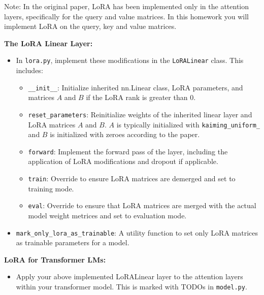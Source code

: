 \documentclass[11pt,addpoints,answers]{exam}
\begin{document}
\begin{questions}
Note: In the original paper, LoRA has been implemented only in the attention layers, specifically for the query and value matrices. In this homework you will implement LoRA on the query, key and value matrices.

\textbf{The LoRA Linear Layer:}

\begin{itemize}
    \item In \lstinline{lora.py}, implement these modifications in the \lstinline{LoRALinear} class. This includes:
    \begin{itemize}
        \item \lstinline{__init__}: Initialize inherited nn.Linear class, LoRA parameters, and matrices \(A\) and \(B\) if the LoRA rank is greater than 0.
        \item \lstinline{reset_parameters}: Reinitialize weights of the inherited linear layer and LoRA matrices \(A\) and \(B\). \(A\) is typically initialized with \lstinline{kaiming_uniform_} and \(B\) is initialized with zeroes according to the paper.
        \item \lstinline{forward}: Implement the forward pass of the layer, including the application of LoRA modifications and dropout if applicable.
        \item \lstinline{train}: Override to ensure LoRA matrices are demerged and set to training mode.
        \item \lstinline{eval}: Override to ensure that LoRA matrices are merged with the actual model weight metrices and set to evaluation mode.

    \end{itemize}
        \item \lstinline{mark_only_lora_as_trainable}: A utility function to set only LoRA matrices as trainable parameters for a model. 
\end{itemize}


\textbf{LoRA for Transformer LMs:}
\begin{itemize}
    \item Apply your above implemented LoRALinear layer to the attention layers within your transformer model. This is marked with TODOs in \lstinline{model.py}. 
\end{itemize}


\end{questions}
\end{document}
